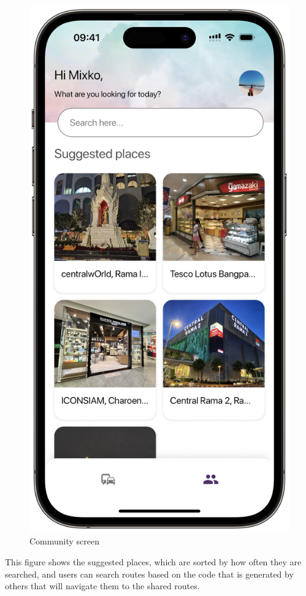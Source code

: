 \newpage
\begin{figure}[!h]
	\centering
	\includegraphics[width=0.5\linewidth]{chapter4/community_screen.png}
	\caption{Community screen}
	\label{fig:Community screen}
\end{figure}
This figure shows the suggested places, which are sorted by how often they are searched, and users can search routes based on the code that is generated by others that will navigate them to the shared routes.

\newpage
